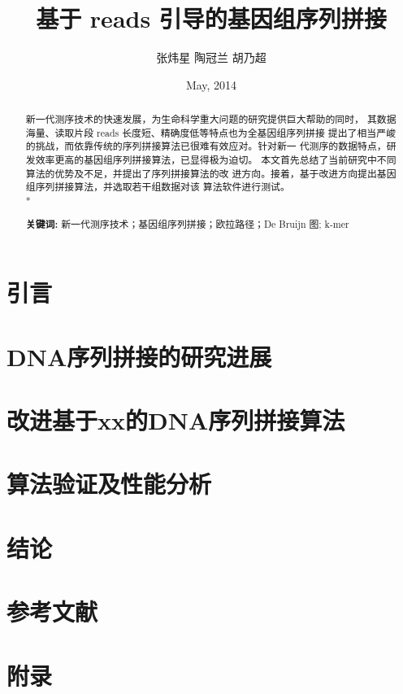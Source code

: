 \documentclass[a4paper]{article}
\title{基于 reads 引导的基因组序列拼接 }
\author{张炜星 陶冠兰 胡乃超}
\date{May, 2014}
\begin{document}
\maketitle
\begin{abstract}
新一代测序技术的快速发展，为生命科学重大问题的研究提供巨大帮助的同时，
其数据海量、读取片段 reads 长度短、精确度低等特点也为全基因组序列拼接
提出了相当严峻的挑战，而依靠传统的序列拼接算法已很难有效应对。针对新一
代测序的数据特点，研发效率更高的基因组序列拼接算法，已显得极为迫切。
本文首先总结了当前研究中不同算法的优势及不足，并提出了序列拼接算法的改
进方向。接着，基于改进方向提出基因组序列拼接算法，并选取若干组数据对该
算法软件进行测试。\\*
\vspace{0.4cm}

\textbf{关键词:} 新一代测序技术；基因组序列拼接；欧拉路径；De Bruijn 图; k-mer

\end{abstract}

\section{引言}

\section{DNA序列拼接的研究进展}

\section{改进基于xx的DNA序列拼接算法}

\section{算法验证及性能分析}

\section{结论}

\section*{参考文献}
\section*{附录}
\end{document}

